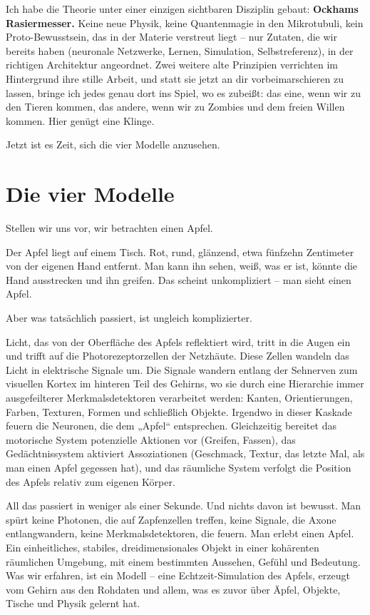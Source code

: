 \documentclass[11pt, twoside, openright]{book}
\begin{document}
Ich habe die Theorie unter einer einzigen sichtbaren Disziplin gebaut: \textbf{Ockhams Rasiermesser.} Keine neue Physik, keine Quantenmagie in den Mikrotubuli, kein Proto-Bewusstsein, das in der Materie verstreut liegt -- nur Zutaten, die wir bereits haben (neuronale Netzwerke, Lernen, Simulation, Selbstreferenz), in der richtigen Architektur angeordnet. Zwei weitere alte Prinzipien verrichten im Hintergrund ihre stille Arbeit, und statt sie jetzt an dir vorbeimarschieren zu lassen, bringe ich jedes genau dort ins Spiel, wo es zubeißt: das eine, wenn wir zu den Tieren kommen, das andere, wenn wir zu Zombies und dem freien Willen kommen. Hier genügt eine Klinge.

Jetzt ist es Zeit, sich die vier Modelle anzusehen.

\chapter{Die vier Modelle}

Stellen wir uns vor, wir betrachten einen Apfel.

Der Apfel liegt auf einem Tisch. Rot, rund, glänzend, etwa fünfzehn Zentimeter von der eigenen Hand entfernt. Man kann ihn sehen, weiß, was er ist, könnte die Hand ausstrecken und ihn greifen. Das scheint unkompliziert -- man sieht einen Apfel.

Aber was tatsächlich passiert, ist ungleich komplizierter.

Licht, das von der Oberfläche des Apfels reflektiert wird, tritt in die Augen ein und trifft auf die Photorezeptorzellen der Netzhäute. Diese Zellen wandeln das Licht in elektrische Signale um. Die Signale wandern entlang der Sehnerven zum visuellen Kortex im hinteren Teil des Gehirns, wo sie durch eine Hierarchie immer ausgefeilterer Merkmalsdetektoren verarbeitet werden: Kanten, Orientierungen, Farben, Texturen, Formen und schließlich Objekte. Irgendwo in dieser Kaskade feuern die Neuronen, die dem „Apfel“ entsprechen. Gleichzeitig bereitet das motorische System potenzielle Aktionen vor (Greifen, Fassen), das Gedächtnissystem aktiviert Assoziationen (Geschmack, Textur, das letzte Mal, als man einen Apfel gegessen hat), und das räumliche System verfolgt die Position des Apfels relativ zum eigenen Körper.

All das passiert in weniger als einer Sekunde. Und nichts davon ist bewusst. Man spürt keine Photonen, die auf Zapfenzellen treffen, keine Signale, die Axone entlangwandern, keine Merkmalsdetektoren, die feuern. Man erlebt einen Apfel. Ein einheitliches, stabiles, dreidimensionales Objekt in einer kohärenten räumlichen Umgebung, mit einem bestimmten Aussehen, Gefühl und Bedeutung. Was wir erfahren, ist ein Modell -- eine Echtzeit-Simulation des Apfels, erzeugt vom Gehirn aus den Rohdaten und allem, was es zuvor über Äpfel, Objekte, Tische und Physik gelernt hat.
\end{document}
